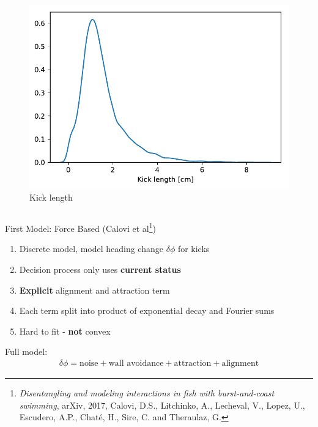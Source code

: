 \documentclass{beamer}
\begin{document}
\begin{frame}
\begin{columns}
\begin{column}{0.4\linewidth}
  \begin{figure}[h]
    \centering
\includegraphics[clip, width=0.8\linewidth]{kick_length.pdf}
    \caption*{Kick length}
  \end{figure}
\end{column}

\end{columns}
\end{frame}

\begin{frame}{First Model: Force Based (Calovi et al\footnote{\hspace*{0.1cm}\textit{Disentangling and modeling interactions in fish with burst-and-coast swimming}, arXiv, 2017, Calovi, D.S., Litchinko, A., Lecheval, V., Lopez, U., Escudero, A.P., Chaté, H., Sire, C. and Theraulaz, G.})}
\begin{enumerate}
\item Discrete model, model heading change $\delta \phi$ for kicks
\item Decision process only uses \textbf{current status}
\item \textbf{Explicit} alignment and attraction term
\item Each term split into product of exponential decay and Fourier sums
\item Hard to fit - \textbf{not} convex
\end{enumerate}
Full model:
\begin{align*}
  \label{eq:calovi-model}
  \delta \phi = \text{noise} + \text{wall avoidance} + \text{attraction} + \text{alignment}
\end{align*}
\end{frame}
\end{document}
